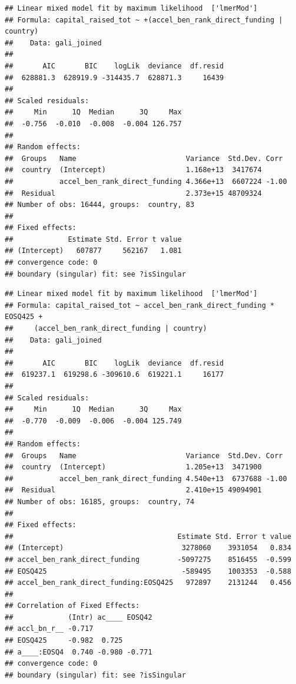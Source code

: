 \documentclass[
  english,
  man]{apa6}
\begin{document}
\begin{verbatim}
## Linear mixed model fit by maximum likelihood  ['lmerMod']
## Formula: capital_raised_tot ~ +(accel_ben_rank_direct_funding | country)
##    Data: gali_joined
## 
##       AIC       BIC    logLik  deviance  df.resid 
##  628881.3  628919.9 -314435.7  628871.3     16439 
## 
## Scaled residuals: 
##     Min      1Q  Median      3Q     Max 
##  -0.756  -0.010  -0.008  -0.004 126.757 
## 
## Random effects:
##  Groups   Name                          Variance  Std.Dev. Corr 
##  country  (Intercept)                   1.168e+13  3417674      
##           accel_ben_rank_direct_funding 4.366e+13  6607224 -1.00
##  Residual                               2.373e+15 48709324      
## Number of obs: 16444, groups:  country, 83
## 
## Fixed effects:
##             Estimate Std. Error t value
## (Intercept)   607877     562167   1.081
## convergence code: 0
## boundary (singular) fit: see ?isSingular
\end{verbatim}

\begin{verbatim}
## Linear mixed model fit by maximum likelihood  ['lmerMod']
## Formula: capital_raised_tot ~ accel_ben_rank_direct_funding * EOSQ425 +  
##     (accel_ben_rank_direct_funding | country)
##    Data: gali_joined
## 
##       AIC       BIC    logLik  deviance  df.resid 
##  619237.1  619298.6 -309610.6  619221.1     16177 
## 
## Scaled residuals: 
##     Min      1Q  Median      3Q     Max 
##  -0.770  -0.009  -0.006  -0.004 125.749 
## 
## Random effects:
##  Groups   Name                          Variance  Std.Dev. Corr 
##  country  (Intercept)                   1.205e+13  3471900      
##           accel_ben_rank_direct_funding 4.540e+13  6737688 -1.00
##  Residual                               2.410e+15 49094901      
## Number of obs: 16185, groups:  country, 74
## 
## Fixed effects:
##                                       Estimate Std. Error t value
## (Intercept)                            3278060    3931054   0.834
## accel_ben_rank_direct_funding         -5097275    8516455  -0.599
## EOSQ425                                -589495    1003353  -0.588
## accel_ben_rank_direct_funding:EOSQ425   972897    2131244   0.456
## 
## Correlation of Fixed Effects:
##             (Intr) ac____ EOSQ42
## accl_bn_r__ -0.717              
## EOSQ425     -0.982  0.725       
## a____:EOSQ4  0.740 -0.980 -0.771
## convergence code: 0
## boundary (singular) fit: see ?isSingular
\end{verbatim}
\end{document}
